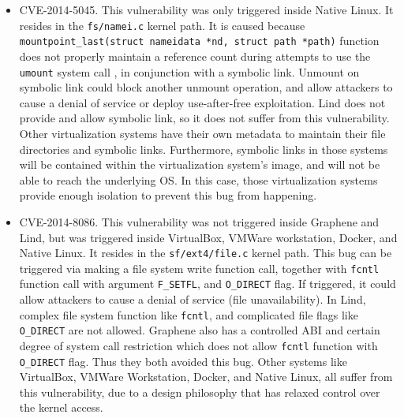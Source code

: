 \begin{itemize}
\item CVE-2014-5045. This vulnerability was only triggered inside Native Linux. It resides in the 
\texttt{fs/namei.c} kernel path. It is caused because 
\texttt{mountpoint\_last(struct nameidata *nd, struct path *path)} function does not properly 
maintain a reference count during attempts to use the \texttt{umount} system call 
, in conjunction with a symbolic link. Unmount on symbolic link could block another unmount operation, 
and allow attackers to cause a denial of service or deploy use-after-free exploitation. 
Lind does not provide and allow symbolic link, so it does not suffer from this vulnerability. 
Other virtualization systems have their own metadata to maintain their file directories and symbolic links. 
Furthermore, symbolic links in those systems will be contained within the virtualization system's image, 
and will not be able to reach the underlying OS. In this case, those virtualization systems provide enough 
isolation to prevent this bug from happening. 

\item CVE-2014-8086. This vulnerability was not triggered inside Graphene and Lind, but was triggered inside 
VirtualBox, VMWare workstation, Docker, and Native Linux. It resides in the \texttt{sf/ext4/file.c} kernel path. 
This bug can be triggered via making a file system write function call, together with \texttt{fcntl} function call 
with argument \texttt{F\_SETFL}, and \texttt{O\_DIRECT} flag. If triggered, it could allow attackers to cause 
a denial of service (file unavailability). In Lind, complex file system function like \texttt{fcntl}, and complicated 
file flags like \texttt{O\_DIRECT} are not allowed. Graphene also has a controlled ABI and certain degree of 
system call restriction which does not allow \texttt{fcntl} function with \texttt{O\_DIRECT} flag. 
Thus they both avoided this bug. Other systems like VirtualBox, VMWare Workstation, Docker, and Native Linux, 
all suffer from this vulnerability, due to a design philosophy that has relaxed control over the kernel access. 

\end{itemize}

